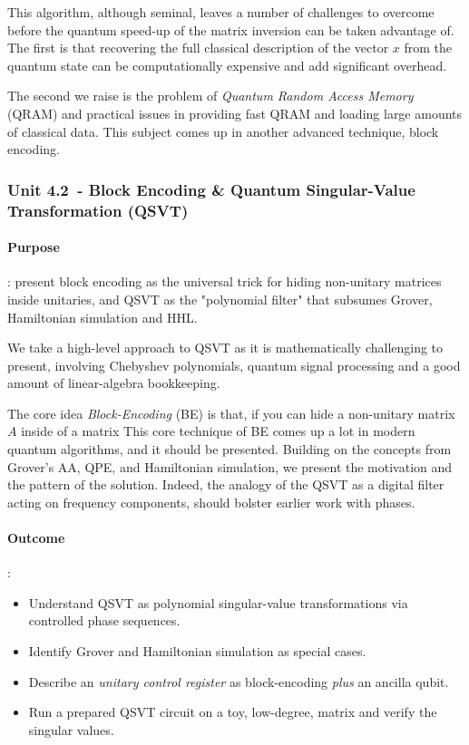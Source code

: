 This algorithm, although seminal, leaves a number of challenges to overcome before the quantum speed-up of the 
matrix inversion can be taken advantage of.  The first is that recovering the full classical description of the 
vector $x$ from the quantum state can be computationally expensive and add significant overhead.

The second we raise is the problem of \emph{Quantum Random Access Memory} (QRAM) 
and practical issues in providing fast QRAM and loading large amounts of classical data.  
This subject comes up in another advanced technique, block encoding.

\subsubsection*{Unit 4.2 - Block Encoding \& Quantum Singular-Value Transformation (QSVT)}

\paragraph{Purpose}: present block encoding as the universal trick for hiding non-unitary matrices inside unitaries, 
and QSVT as the "polynomial filter" that subsumes Grover, Hamiltonian simulation and HHL.

We take a high-level approach to QSVT as it is mathematically challenging to present, involving Chebyshev polynomials,
quantum signal processing and a good amount of linear-algebra bookkeeping.

The core idea \emph{Block-Encoding} (BE) is that, if you can hide a non-unitary matrix $A$ inside of a matrix 
This core technique of BE comes up a lot in modern quantum algorithms, and it should be presented.  
Building on the concepts from Grover's AA, QPE, and Hamiltonian simulation, we present the motivation 
and the pattern of the solution.  
Indeed, the analogy of the QSVT as a digital filter acting on frequency components, should bolster earlier work with phases.

\paragraph{Outcome}:
\begin{itemize}
	\item Understand QSVT as polynomial singular-value transformations via controlled phase sequences.
	\item Identify Grover and Hamiltonian simulation as special cases.
	\item Describe an \emph{unitary control register} as block-encoding \emph{plus} an ancilla qubit.
	\item Run a prepared QSVT circuit on a toy, low-degree, matrix and verify the singular values.
\end{itemize} 

